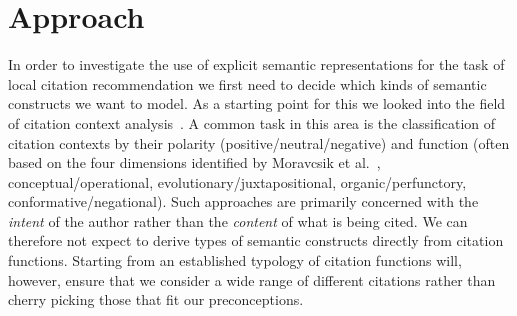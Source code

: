 \chapter{Approach}\label{chap:approach}
In order to investigate the use of explicit semantic representations for the task of local citation recommendation we first need to decide which kinds of semantic constructs we want to model. As a starting point for this we looked into the field of citation context analysis~\cite{HERNANDEZ-ALVAREZ2016}. A common task in this area is the classification of citation contexts by their polarity (positive/neutral/negative) and function (often based on the four dimensions identified by Moravcsik et al.~\cite{Moravcsik1975}, conceptual/operational, evolutionary/juxtapositional, organic/perfunctory, conformative/negational). Such approaches are primarily concerned with the \emph{intent} of the author rather than the \emph{content} of what is being cited. We can therefore not expect to derive types of semantic constructs directly from citation functions. Starting from an established typology of citation functions will, however, ensure that we consider a wide range of different citations rather than cherry picking those that fit our preconceptions.

